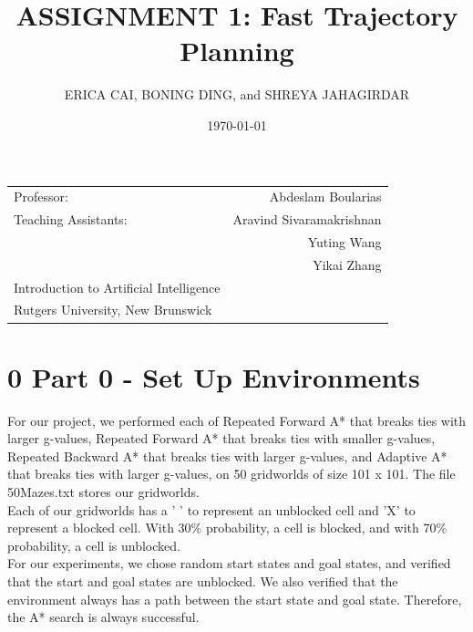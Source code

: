 \documentclass{article}
\title{ASSIGNMENT 1: Fast Trajectory Planning} %
\author{ERICA CAI, BONING DING, and SHREYA JAHAGIRDAR} %
\date{\today} %
\begin{document}
\maketitle %

\begin{center}
\begin{tabular}{l r}
Professor: & Abdeslam Boularias \\ %
Teaching Assistants: & Aravind Sivaramakrishnan  \\ 
&  Yuting Wang \\ %
& Yikai Zhang \\

Introduction to Artificial Intelligence \\
Rutgers University, New Brunswick  \\
\end{tabular}
\end{center}


\section*{0 Part 0 - Set Up Environments}

For our project, we performed each of Repeated Forward A* that breaks ties with larger g-values, Repeated Forward A* that breaks ties with smaller g-values, Repeated Backward A* that breaks ties with larger g-values, and Adaptive A* that breaks ties with larger g-values, on 50 gridworlds of size 101 x 101. The file 50Mazes.txt stores our gridworlds. \\

Each of our gridworlds has a ' ' to represent an unblocked cell and 'X' to represent a blocked cell. With 30\% probability, a cell is blocked, and with 70\% probability, a cell is unblocked. \\

For our experiments, we chose random start states and goal states, and verified that the start and goal states are unblocked. We also verified that the environment always has a path between the start state and goal state. Therefore, the A* search is always successful. \\
\end{document}
